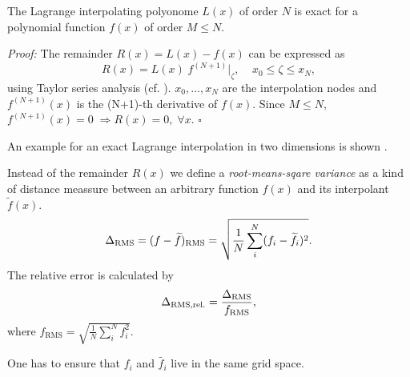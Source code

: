 The Lagrange interpolating polyonome $L(x)$ of order $N$ is exact for a
polynomial function $f(x)$ of order $M \le N$.

\emph{Proof:} The remainder $R(x) = L(x) - f(x)$ can be expressed as
\begin{equation}
    R(x) = L(x) \; f^{(N+1)}|_{\zeta}, \;\;\;\; x_0 \le \zeta \le x_N,
\end{equation}
using Taylor series analysis (cf. \cite[p. 878]{Abram1972}). $x_0,...,x_N$ are
the interpolation nodes and $f^{(N+1)}(x)$ is the (N+1)-th derivative of $f(x)$.
Since $M \le N$, $f^{(N+1)}(x) = 0 \; \Rightarrow R(x) = 0,\; \forall x$. $\square$

An example for an exact Lagrange interpolation in two dimensions is shown
.

Instead of the remainder $R(x)$ we define a \emph{root-means-sqare
variance} as a kind of distance meassure between an arbitrary function $f(x)$ and
its interpolant $\widetilde{f}(x)$.
\begin{equation}
\label{eqn:error-rms}
    \Delta_{\text{RMS}} = (f - \widetilde{f})_{\text{RMS}} = \sqrt{\frac{1}{N} \sum^N_i (f_i - \widetilde{f_i})^2}.
\end{equation}
The relative error is calculated by
\begin{equation}
    \Delta_{\text{RMS,rel.}} = \frac{\Delta_{\text{RMS}}}{f_{\text{RMS}}},
\end{equation}
where $f_{\text{RMS}} = \sqrt{\frac{1}{N} \sum^N_i f^2_i}$. 

\remark One has to ensure that $f_i$ and $\widetilde{f_i}$ live in the same grid space.

% 
% 

